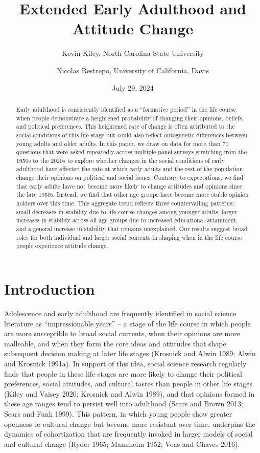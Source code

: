 \documentclass[
  12pt,
]{article}
\title{Extended Early Adulthood and Attitude Change}
\author{Kevin Kiley, North Carolina State University \and Nicolas Restrepo, University of California, Davis}
\date{July 29, 2024}
\begin{document}
\maketitle
\begin{abstract}
Early adulthood is consistently identified as a ``formative period'' in the life course when people demonstrate a heightened probability of changing their opinions, beliefs, and political preferences. This heightened rate of change is often attributed to the social conditions of this life stage but could also reflect ontogenetic differences between young adults and older adults. In this paper, we draw on data for more than 70 questions that were asked repeatedly across multiple panel surveys stretching from the 1950s to the 2020s to explore whether changes in the social conditions of early adulthood have affected the rate at which early adults and the rest of the population change their opinions on political and social issues. Contrary to expectations, we find that early adults have not become more likely to change attitudes and opinions since the late 1950s. Instead, we find that other age groups have become more stable opinion holders over this time. This aggregate trend reflects three countervailing patterns: small decreases in stability due to life-course changes among younger adults, larger increases in stability across all age groups due to increased educational attainment, and a general increase in stability that remains unexplained. Our results suggest broad roles for both individual and larger social contexts in shaping when in the life course people experience attitude change.
\end{abstract}

\doublespace

\hypertarget{introduction}{%
\section{Introduction}\label{introduction}}

Adolescence and early adulthood are frequently identified in social science literature as ``impressionable years'' -- a stage of the life course in which people are more susceptible to broad social currents, when their opinions are more malleable, and when they form the core ideas and attitudes that shape subsequent decision making at later life stages (Krosnick and Alwin 1989; Alwin and Krosnick 1991a). In support of this idea, social science research regularly finds that people in these life stages are more likely to change their political preferences, social attitudes, and cultural tastes than people in other life stages (Kiley and Vaisey 2020; Krosnick and Alwin 1989), and that opinions formed in these age ranges tend to persist well into adulthood (Sears and Brown 2013; Sears and Funk 1999). This pattern, in which young people show greater openness to cultural change but become more resistant over time, underpins the dynamics of cohortization that are frequently invoked in larger models of social and cultural change (Ryder 1965; Mannheim 1952; Voas and Chaves 2016).
\end{document}
